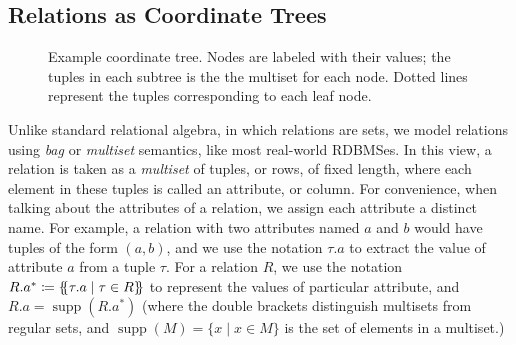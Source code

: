 \documentclass[acmsmall,screen,nonacm]{acmart}\settopmatter{printfolios=true,printccs=false,printacmref=false}
\newcommand*{\lB}{\{\mskip-5mu\{}
\newcommand*{\rB}{\}\mskip-5mu\}}
\DeclareMathOperator{\supp}{supp}
\begin{document}
\subsection{Relations as Coordinate Trees}
\begin{wrapfigure}{l}{0.31\textwidth}
    \footnotesize
    \vspace{-1em}
    \caption{Example coordinate tree. Nodes are labeled with
    their values; the tuples in each subtree is the the multiset for each node.
    Dotted lines represent the tuples corresponding to each
    leaf node.}\vspace{-1em}
    \label{fig:coordtree}
\end{wrapfigure}
Unlike standard relational algebra, in which relations are sets,
we model relations using \emph{bag} or \emph{multiset} semantics, like most real-world RDBMSes.
In this view, a relation is taken as a \emph{multiset} of tuples, or
rows, of fixed length, where each element in these tuples is called an
attribute, or column. For convenience, when talking about the
attributes of a relation, we assign each attribute a
distinct name. For example, a relation with two attributes named $a$
and $b$ would have tuples of the form $(a, b)$, and we use the
notation $\tau.a$ to extract the value of attribute $a$ from a tuple $\tau$.
For a relation $R$, we use the notation $R.a^*
\coloneqq \lB \tau.a \mid \tau \in R \rB$ to represent the values of particular attribute, and $R.a = \supp(R.a^*)$
(where the double brackets distinguish multisets from regular sets,
and $\supp(M) = \{ x \mid x \in M \}$ is the set of elements in a multiset.)
\end{document}
